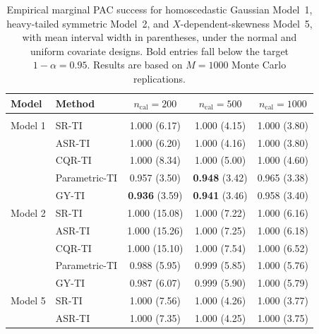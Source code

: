 \begin{table}[!h]
\centering
\caption{\label{tab:marginal-pac-models125}Empirical marginal PAC success for homoscedastic Gaussian Model~1, heavy-tailed symmetric Model~2, and \(X\)-dependent-skewness Model~5, with mean interval width in parentheses, under the normal and uniform covariate designs. Bold entries fall below the target \(1-\alpha=0.95\). Results are based on \(M=1000\) Monte Carlo replications.}
\centering
\fontsize{9}{11}\selectfont
\begin{tabular}[t]{llccc}
\toprule
Model & Method & $n_{\mathrm{cal}}=200$ & $n_{\mathrm{cal}}=500$ & $n_{\mathrm{cal}}=1000$\\
\midrule
\addlinespace[0.3em]
\hline
\multicolumn{5}{l}{\textbf{Normal covariate design}}\\
\hspace{1em}Model 1 & SR-TI & 1.000 (6.17) & 1.000 (4.15) & 1.000 (3.80)\\
\hspace{1em} & ASR-TI & 1.000 (6.20) & 1.000 (4.16) & 1.000 (3.80)\\
\hspace{1em} & CQR-TI & 1.000 (8.34) & 1.000 (5.00) & 1.000 (4.60)\\
\hspace{1em} & Parametric-TI & 0.957 (3.50) & \textbf{0.948} (3.42) & 0.965 (3.38)\\
\hspace{1em} & GY-TI & \textbf{0.936} (3.59) & \textbf{0.941} (3.46) & 0.958 (3.40)\\
\hspace{1em}Model 2 & SR-TI & 1.000 (15.08) & 1.000 (7.22) & 1.000 (6.16)\\
\hspace{1em} & ASR-TI & 1.000 (15.26) & 1.000 (7.25) & 1.000 (6.18)\\
\hspace{1em} & CQR-TI & 1.000 (15.10) & 1.000 (7.54) & 1.000 (6.52)\\
\hspace{1em} & Parametric-TI & 0.988 (5.95) & 0.999 (5.85) & 1.000 (5.76)\\
\hspace{1em} & GY-TI & 0.987 (6.07) & 0.999 (5.90) & 1.000 (5.79)\\
\hspace{1em}Model 5 & SR-TI & 1.000 (7.56) & 1.000 (4.26) & 1.000 (3.77)\\
\hspace{1em} & ASR-TI & 1.000 (7.35) & 1.000 (4.25) & 1.000 (3.75)\\

\end{tabular}
\end{table}
